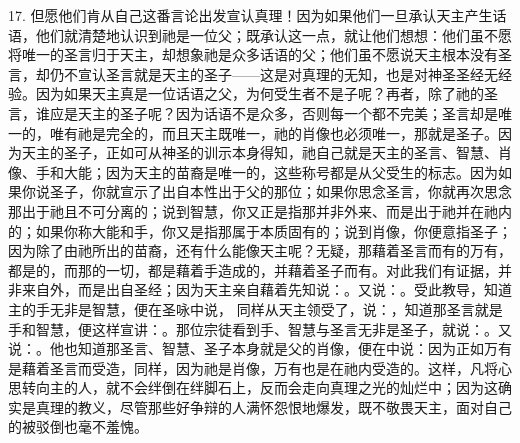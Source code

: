 17. 但愿他们肯从自己这番言论出发宣认真理！因为如果他们一旦承认天主产生话语，他们就清楚地认识到祂是一位父；既承认这一点，就让他们想想：他们虽不愿将唯一的圣言归于天主，却想象祂是众多话语的父；他们虽不愿说天主根本没有圣言，却仍不宣认圣言就是天主的圣子——这是对真理的无知，也是对神圣圣经无经验。因为如果天主真是一位话语之父，为何受生者不是子呢？再者，除了祂的圣言，谁应是天主的圣子呢？因为话语不是众多，否则每一个都不完美；圣言却是唯一的，唯有祂是完全的，而且天主既唯一，祂的肖像也必须唯一，那就是圣子。因为天主的圣子，正如可从神圣的训示本身得知，祂自己就是天主的圣言、智慧、肖像、手和大能；因为天主的苗裔是唯一的，这些称号都是从父受生的标志。因为如果你说圣子，你就宣示了出自本性出于父的那位；如果你思念圣言，你就再次思念那出于祂且不可分离的；说到智慧，你又正是指那并非外来、而是出于祂并在祂内的；如果你称大能和手，你又是指那属于本质固有的；说到肖像，你便意指圣子；因为除了由祂所出的苗裔，还有什么能像天主呢？无疑，那藉着圣言而有的万有，都是的，而那的一切，都是藉着手造成的，并藉着圣子而有。对此我们有证据，并非来自外，而是出自圣经；因为天主亲自藉着先知说：。又说：。受此教导，知道主的手无非是智慧，便在圣咏中说， 同样从天主领受了，说：，知道那圣言就是手和智慧，便这样宣讲：。那位宗徒看到手、智慧与圣言无非是圣子，就说：。又说：。他也知道那圣言、智慧、圣子本身就是父的肖像，便在中说：因为正如万有是藉着圣言而受造，同样，因为祂是肖像，万有也是在祂内受造的。这样，凡将心思转向主的人，就不会绊倒在绊脚石上，反而会走向真理之光的灿烂中；因为这确实是真理的教义，尽管那些好争辩的人满怀怨恨地爆发，既不敬畏天主，面对自己的被驳倒也毫不羞愧。\par

